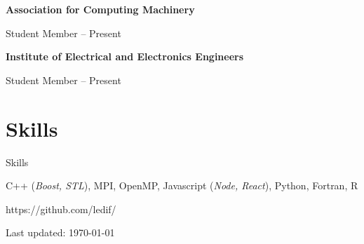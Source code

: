 \documentclass[a4paper,10pt,oneside]{article}
\begin{document}
\begin{body}
\EntryGap

{\textbf{Association for Computing Machinery}}
\par
Student Member
\hfill
{} --
Present

\EntryGap
{\textbf{Institute of Electrical and Electronics Engineers }}
\par
Student Member
\hfill
{} --
Present









\section{Skills}
{Skills}

C++ (\emph{Boost, STL}), MPI, OpenMP, Javascript (\emph{Node, React}), Python, Fortran, R
\par
\EntryGap
https://github.com/ledif/





\EntryGap
\EntryGap
\EntryGap

  \begin{small}
    Last updated: \today
  \end{small}


\end{body}
\end{document}
